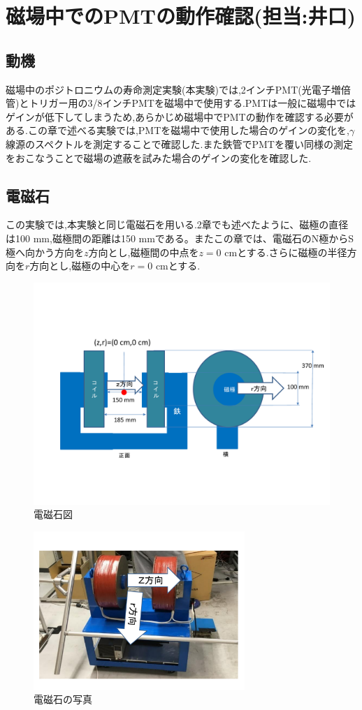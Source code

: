 \chapter{磁場中でのPMTの動作確認(担当:井口)}\label{PMT}

\section{動機}
磁場中のポジトロニウムの寿命測定実験(本実験)では,2インチPMT(光電子増倍管)とトリガー用の3/8インチPMTを磁場中で使用する.PMTは一般に磁場中ではゲインが低下してしまうため,あらかじめ磁場中でPMTの動作を確認する必要がある.この章で述べる実験では,PMTを磁場中で使用した場合のゲインの変化を,$\gamma$線源のスペクトルを測定することで確認した.また鉄管でPMTを覆い同様の測定をおこなうことで磁場の遮蔽を試みた場合のゲインの変化を確認した.


\section{電磁石}
この実験では,本実験と同じ電磁石を用いる.2章でも述べたように、磁極の直径は100 mm,磁極間の距離は150 mmである。またこの章では、電磁石のN極からS極へ向かう方向を$z$方向とし,磁極間の中点を$z=0$ cmとする.さらに磁極の半径方向を$r$方向とし,磁極の中心を$r=0$ cmとする.
\begin{figure}[h!]
	\centering
	\includegraphics[width=13cm]{fig/iguchi/magnetfigure.pdf}
	\caption{電磁石図}
	\label{magfigure}
\end{figure}

\begin{figure}[h!]
	\centering
	\includegraphics[width=8cm]{fig/iguchi/magnetphoto.pdf}
	\caption{電磁石の写真}
	\label{magphoto}
\end{figure}

